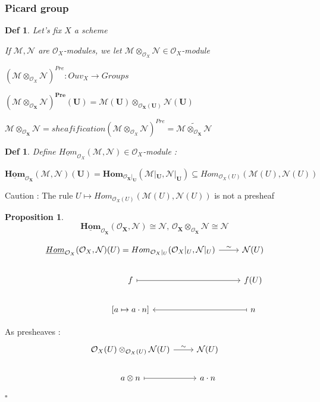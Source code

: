 \documentclass{article}
\newtheorem{definition}[theorem]{Def}
\newtheorem{proposition}[theorem]{Proposition}
\newenvironment{Proof}{{\noindent \indent \it Proof:\quad}}{\hfill $\square$\par}
\begin{document}
\subsubsection{Picard group}
\begin{definition}
    Let's fix $X$ a scheme

    If $\mathcal M,\mathcal N$ are $\mathcal O_X$-modules, we let $\mathcal M\otimes_{\mathcal O_X}\mathcal N\in\mathcal O_X$-module

$(\mathcal M\otimes_{\mathcal O_X}\mathcal N)^{Pre}:Ouv_X\to Groups$

$\bm{(\mathcal M\otimes_{\mathcal O_X}\mathcal N)^{Pre}(U)=\mathcal M(U)\otimes_{\mathcal O_X(U)}\mathcal N(U)}$

$\bm{\mathcal M\otimes_{\mathcal O_X}\mathcal N}
=sheafification (\mathcal M\otimes_{\mathcal O_X}\mathcal N)^{Pre}
=\bm{\widetilde{\mathcal M\otimes_{\mathcal O_X}\mathcal N}}$
\end{definition}

\begin{definition}
    Define $\underline {Hom}_{\mathcal O_X}(\mathcal M,\mathcal N)\in\mathcal O_X$-module :
    
    $\bm{\underline {Hom}_{\mathcal O_X}(\mathcal M,\mathcal N)(U)
    =Hom_{\mathcal O_X|_U}(\mathcal M|_U,\mathcal N|_U)
    }\subseteq Hom_{\mathcal O_X(U)}(\mathcal M(U),\mathcal N(U))$
\end{definition}

Caution : The rule $U\mapsto Hom_{\mathcal O_X(U)}(\mathcal M(U),\mathcal N(U))$ is not a presheaf

\begin{proposition}
    $$
    \bm{\underline {Hom}_{\mathcal O_X}(\mathcal O_X,\mathcal N)\cong \mathcal N,\,\mathcal O_X\otimes_{\mathcal O_X}\mathcal N\cong \mathcal N}
    $$
\end{proposition}
\begin{Proof}
\[\begin{tikzcd}
	{\underline {Hom}_{\mathcal O_X}(\mathcal O_X,\mathcal N) (U)=Hom_{\mathcal O_X|_U}(\mathcal O_X|_U,\mathcal N|_U)} & {\mathcal N(U)} \\
	f & {f(U)} \\
	{[a\mapsto a\cdot n]} & n
	\arrow["\sim", from=1-1, to=1-2]
	\arrow[maps to, from=2-1, to=2-2]
	\arrow[maps to, from=3-2, to=3-1]
\end{tikzcd}\]

As presheaves :
\[\begin{tikzcd}
	{\mathcal O_X(U)\otimes_{\mathcal O_X(U)}\mathcal N(U)} & {\mathcal N(U)} \\
	{a\otimes n} & {a\cdot n}
	\arrow["\sim", from=1-1, to=1-2]
	\arrow[maps to, from=2-1, to=2-2]
\end{tikzcd}\]
\end{Proof}
\end{document}
